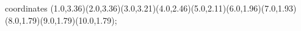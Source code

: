 					coordinates { (1.0,3.36)(2.0,3.36)(3.0,3.21)(4.0,2.46)(5.0,2.11)(6.0,1.96)(7.0,1.93)(8.0,1.79)(9.0,1.79)(10.0,1.79)};